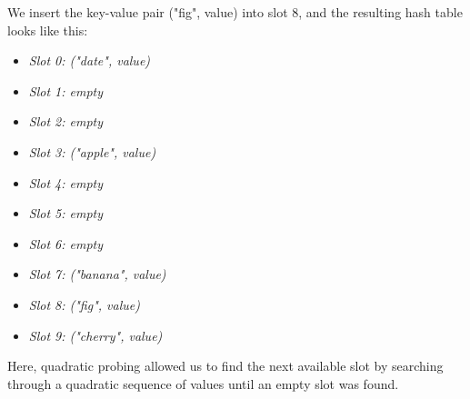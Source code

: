 \documentclass[11pt]{article}
\begin{document}
\begin{enumerate}
          We insert the key-value pair ("fig", value) into slot 8, and the resulting hash table looks like this:

          \begin{itemize}
              \item \textit{Slot 0: ("date", value)}
              \item \textit{Slot 1: empty}
              \item \textit{Slot 2: empty}
              \item \textit{Slot 3: ("apple", value)}
              \item \textit{Slot 4: empty}
              \item \textit{Slot 5: empty}
              \item \textit{Slot 6: empty}
              \item \textit{Slot 7: ("banana", value)}
              \item \textit{Slot 8: ("fig", value)}
              \item \textit{Slot 9: ("cherry", value)}
          \end{itemize}

          Here, quadratic probing allowed us to find the next available slot by searching through a quadratic sequence of values until an empty slot was found.
\end{enumerate}
\end{document}
